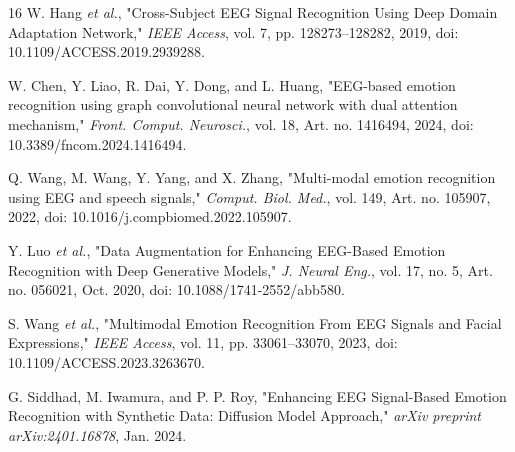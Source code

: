 \documentclass[conference]{IEEEtran}
\begin{document}
\begin{thebibliography}{16}
W. Hang \textit{et al.}, "Cross-Subject EEG Signal Recognition Using Deep Domain Adaptation Network," \textit{IEEE Access}, vol. 7, pp. 128273--128282, 2019, doi: 10.1109/ACCESS.2019.2939288.

W. Chen, Y. Liao, R. Dai, Y. Dong, and L. Huang, "EEG-based emotion recognition using graph convolutional neural network with dual attention mechanism," \textit{Front. Comput. Neurosci.}, vol. 18, Art. no. 1416494, 2024, doi: 10.3389/fncom.2024.1416494.

Q. Wang, M. Wang, Y. Yang, and X. Zhang, "Multi-modal emotion recognition using EEG and speech signals," \textit{Comput. Biol. Med.}, vol. 149, Art. no. 105907, 2022, doi: 10.1016/j.compbiomed.2022.105907.

Y. Luo \textit{et al.}, "Data Augmentation for Enhancing EEG-Based Emotion Recognition with Deep Generative Models," \textit{J. Neural Eng.}, vol. 17, no. 5, Art. no. 056021, Oct. 2020, doi: 10.1088/1741-2552/abb580.

S. Wang \textit{et al.}, "Multimodal Emotion Recognition From EEG Signals and Facial Expressions," \textit{IEEE Access}, vol. 11, pp. 33061--33070, 2023, doi: 10.1109/ACCESS.2023.3263670.

G. Siddhad, M. Iwamura, and P. P. Roy, "Enhancing EEG Signal-Based Emotion Recognition with Synthetic Data: Diffusion Model Approach," \textit{arXiv preprint arXiv:2401.16878}, Jan. 2024.


\end{thebibliography}
\end{document}
